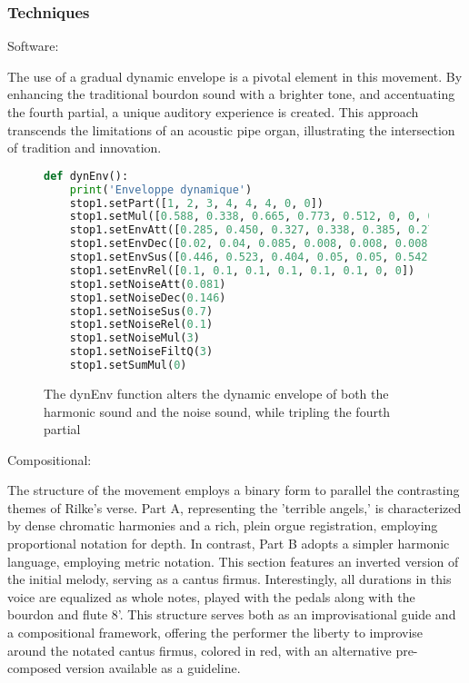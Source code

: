 \documentclass[12pt,twoside,maitrise]{dms}
\theoremstyle{definition}
\begin{document}
\subsubsection{Techniques}

Software:

The use of a gradual dynamic envelope is a pivotal element in this movement.
By enhancing the traditional bourdon sound with a brighter tone, and accentuating the fourth partial, a unique auditory experience is created.
This approach transcends the limitations of an acoustic pipe organ, illustrating the intersection of tradition and innovation.

\begin{figure}[H]
\begin{lstlisting}[language=Python]
def dynEnv():
    print('Enveloppe dynamique')
    stop1.setPart([1, 2, 3, 4, 4, 4, 0, 0])
    stop1.setMul([0.588, 0.338, 0.665, 0.773, 0.512, 0, 0, 0])
    stop1.setEnvAtt([0.285, 0.450, 0.327, 0.338, 0.385, 0.277, 0, 0])
    stop1.setEnvDec([0.02, 0.04, 0.085, 0.008, 0.008, 0.008, 0, 0])
    stop1.setEnvSus([0.446, 0.523, 0.404, 0.05, 0.05, 0.542, 0, 0])
    stop1.setEnvRel([0.1, 0.1, 0.1, 0.1, 0.1, 0.1, 0, 0])
    stop1.setNoiseAtt(0.081)
    stop1.setNoiseDec(0.146)
    stop1.setNoiseSus(0.7)
    stop1.setNoiseRel(0.1)
    stop1.setNoiseMul(3)
    stop1.setNoiseFiltQ(3)
    stop1.setSumMul(0)
\end{lstlisting}
\caption{The dynEnv function alters the dynamic envelope of both the harmonic sound and the noise sound, while tripling the fourth partial}
\end{figure}

Compositional:

The structure of the movement employs a binary form to parallel the contrasting themes of Rilke's verse.
Part A, representing the 'terrible angels,' is characterized by dense chromatic harmonies and a rich, plein orgue registration, employing proportional notation for depth.
In contrast, Part B adopts a simpler harmonic language, employing metric notation.
This section features an inverted version of the initial melody, serving as a cantus firmus.
Interestingly, all durations in this voice are equalized as whole notes, played with the pedals along with the bourdon and flute 8’.
This structure serves both as an improvisational guide and a compositional framework, offering the performer the liberty to improvise around the notated cantus firmus, colored in red, with an alternative pre-composed version available as a guideline.
\end{document}
